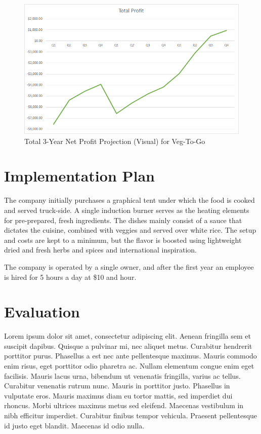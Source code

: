 \documentclass[12pt, letterpaper]{article}
\newcommand{\companyname}{Veg-To-Go}
\begin{document}
\begin{figure}[H]
	\caption{Total 3-Year Net Profit Projection (Visual) for \companyname{}}
	\includegraphics[width=\textwidth]{TotalProfit}
\end{figure}

\section{Implementation Plan}
The company initially purchases a graphical tent under which the food is cooked and served truck-side.  A single induction burner serves as the heating elements for pre-prepared, fresh ingredients.  The dishes mainly consist of a sauce that dictates the cuisine, combined with veggies and served over white rice.  The setup and costs are kept to a minimum, but the flavor is boosted using lightweight dried and fresh herbs and spices and international inspiration.

The company is operated by a single owner, and after the first year an employee is hired for 5 hours a day at \$10 and hour.

\section{Evaluation}
Lorem ipsum dolor sit amet, consectetur adipiscing elit. Aenean fringilla sem et suscipit dapibus. Quisque a pulvinar mi, nec aliquet metus. Curabitur hendrerit porttitor purus. Phasellus a est nec ante pellentesque maximus. Mauris commodo enim risus, eget porttitor odio pharetra ac. Nullam elementum congue enim eget facilisis. Mauris lacus urna, bibendum ut venenatis fringilla, varius ac tellus. Curabitur venenatis rutrum nunc. Mauris in porttitor justo. Phasellus in vulputate eros. Mauris maximus diam eu tortor mattis, sed imperdiet dui rhoncus. Morbi ultrices maximus metus sed eleifend. Maecenas vestibulum in nibh efficitur imperdiet. Curabitur finibus tempor vehicula. Praesent pellentesque id justo eget blandit. Maecenas id odio nulla.
\end{document}
